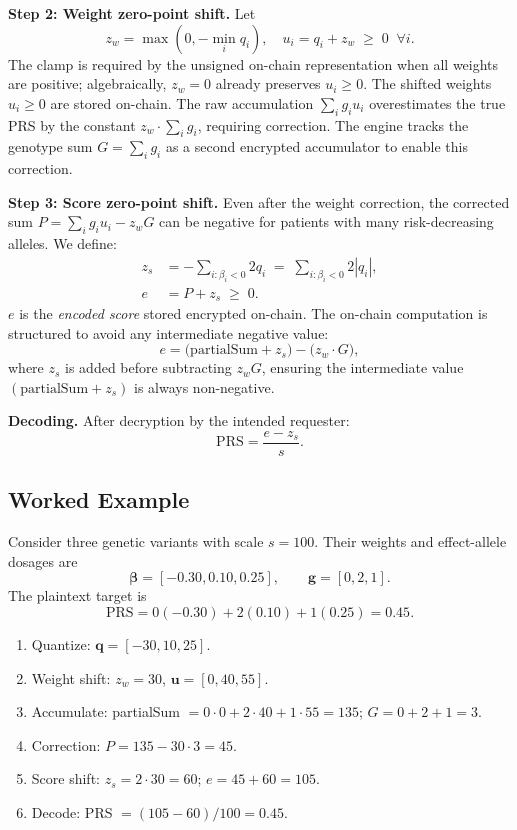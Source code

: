 \documentclass[10pt]{article}
\begin{document}
\textbf{Step 2: Weight zero-point shift.}  Let
\begin{equation}
z_w = \max(0,-\min_i q_i), \quad u_i = q_i + z_w \;\geq\; 0 \;\;\forall i.
\label{eq:wshift}
\end{equation}
The clamp is required by the unsigned on-chain representation when all weights are
positive; algebraically, $z_w=0$ already preserves $u_i\geq0$.  The shifted weights
$u_i \geq 0$ are stored on-chain.  The raw accumulation
$\sum_i g_i u_i$ overestimates the true PRS by the constant $z_w \cdot \sum_i g_i$,
requiring correction.  The engine tracks the genotype sum
$G = \sum_i g_i$ as a second encrypted accumulator to enable this correction.

\textbf{Step 3: Score zero-point shift.}
Even after the weight correction, the corrected sum
$P = \sum_i g_i u_i - z_w G$
can be negative for patients with many risk-decreasing alleles.  We define:
\begin{align}
z_s &= -\sum_{i:\beta_i<0} 2 q_i \;=\; \sum_{i:\beta_i<0} 2|q_i|,\\
e   &= P + z_s \;\geq\; 0.
\end{align}
$e$ is the \emph{encoded score} stored encrypted on-chain.  The on-chain
computation is structured to avoid any intermediate negative value:
\begin{equation}
e = \bigl(\mathrm{partialSum} + z_s\bigr) - \bigl(z_w \cdot G\bigr),
\label{eq:encode}
\end{equation}
where $z_s$ is added before subtracting $z_w G$, ensuring the intermediate
value $(\mathrm{partialSum} + z_s)$ is always non-negative.

\textbf{Decoding.}  After decryption by the intended requester:
\begin{equation}
\mathrm{PRS} = \frac{e - z_s}{s}.
\end{equation}

\subsection{Worked Example}

Consider three genetic variants with scale $s=100$.  Their weights and effect-allele
dosages are
\[
\boldsymbol{\beta}=[-0.30,0.10,0.25],\qquad \mathbf{g}=[0,2,1].
\]
The plaintext target is
\[
\mathrm{PRS}=0(-0.30)+2(0.10)+1(0.25)=0.45.
\]

\begin{enumerate}
  \item Quantize: $\mathbf{q} = [-30, 10, 25]$.
  \item Weight shift: $z_w = 30$, $\mathbf{u} = [0, 40, 55]$.
  \item Accumulate: partialSum $= 0{\cdot}0 + 2{\cdot}40 + 1{\cdot}55 = 135$;
        $G = 0 + 2 + 1 = 3$.
  \item Correction: $P = 135 - 30{\cdot}3 = 45$.
  \item Score shift: $z_s = 2{\cdot}30 = 60$; $e = 45 + 60 = 105$.
  \item Decode: PRS $= (105 - 60) / 100 = 0.45$.
\end{enumerate}
\end{document}
